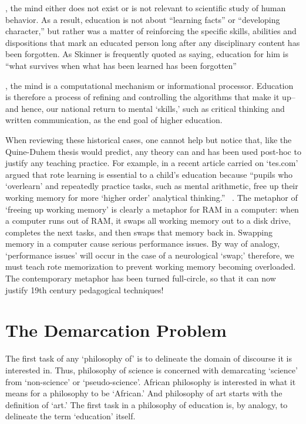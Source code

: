 , the mind either does not exist or is not relevant to scientific study of human behavior. As a result, education is not about ``learning facts'' or ``developing character,'' but rather was a matter of reinforcing the specific skills, abilities and dispositions that mark an educated person long after any disciplinary content has been forgotten. As Skinner is frequently quoted as saying, education for him is ``what survives when what has been learned has been forgotten'' ~\citep{Skinner:1964tx} 

, the mind is a computational mechanism or informational processor. Education is therefore a process of refining and controlling the algorithms that make it up--and hence, our national return to mental `skills,' such as critical thinking and written communication, as the end goal of higher education. 

When reviewing these historical cases, one cannot help but notice that, like the Quine-Duhem thesis would predict, any theory can and has been used post-hoc to justify any teaching practice. For example, in a recent article carried on `tes.com' argued that rote learning is essential to a child's education because ``pupils who `overlearn' and repeatedly practice tasks, such as mental arithmetic, free up their working memory for more `higher order' analytical thinking.'' ~\citep{Anonymous:2016wy}. The metaphor of `freeing up working memory' is clearly a metaphor for RAM in a computer: when a computer runs out of RAM, it swaps all working memory out to a disk drive, completes the next tasks, and then swaps that memory back in. Swapping memory in a computer cause serious performance issues. By way of analogy, `performance issues' will occur in the case of a neurological `swap;' therefore, we must teach rote memorization to prevent working memory becoming overloaded. The contemporary metaphor has been turned full-circle, so that it can now justify 19th century pedagogical techniques!

\section{The Demarcation Problem}
\label{thedemarcationproblem}

The first task of any `philosophy of' is to delineate the domain of discourse it is interested in. Thus, philosophy of science is concerned with demarcating `science' from `non-science' or `pseudo-science'. African philosophy is interested in what it means for a philosophy to be `African.' And philosophy of art starts with the definition of `art.' The first task in a philosophy of education is, by analogy, to delineate the term `education' itself.

